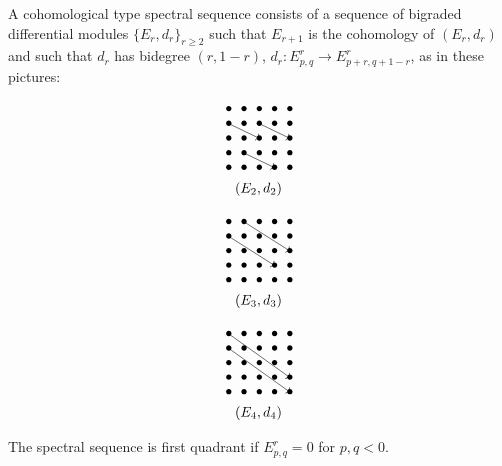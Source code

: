 \documentclass[../main.tex]{subfiles}
\begin{document}
\begin{defn}
\label{ss4:cohotype}

A cohomological type spectral sequence consists of a sequence of bigraded differential modules  $\{E_r,d_r\}_{r\geq 2}$ such that $E_{r+1}$ is the cohomology of $(E_r,d_r)$ and such that $d_r$ has bidegree $(r,1-r)$, $d_r\colon E^r_{p,q}\to E^r_{p+r,q+1-r}$, as in these pictures:

\begin{minipage}{0.3\textwidth}
\begin{align*}
&\xymatrix@=0pt{
 \bullet & \bullet & \bullet & \bullet & \bullet \\
 \bullet & \bullet & \bullet & \bullet & \bullet \\
 \bullet & \bullet & \ar@{<-}[]+C;[llu]+C\bullet & \bullet & \ar@{<-}[]+C;[llu]+C\bullet \\
 \bullet & \bullet & \bullet & \bullet & \bullet \\
 \bullet & \bullet & \bullet & \ar@{<-}[]+C;[llu]+C\bullet & \bullet \\
}\\
&\hspace{10pt}(E_2,d_2)
\end{align*}
\end{minipage}
\begin{minipage}{0.3\textwidth}
\begin{align*}
&\xymatrix@=0pt{
 \bullet & \bullet & \bullet & \bullet & \bullet \\
 \bullet & \bullet & \bullet & \bullet & \bullet \\
 \bullet & \bullet & \bullet & \bullet & \ar@{<-}[]+C;[llluu]+C\bullet \\
 \bullet & \bullet & \bullet & \ar@{<-}[]+C;[llluu]+C\bullet & \bullet \\
 \bullet & \bullet & \bullet & \bullet & \bullet \\
}\\
&\hspace{10pt}(E_3,d_3)
\end{align*}
\end{minipage}
\begin{minipage}{0.3\textwidth}
\begin{align*}
&\xymatrix@=0pt{
 \bullet & \bullet & \bullet & \bullet & \bullet \\
 \bullet & \bullet & \bullet & \bullet & \bullet \\
 \bullet & \bullet & \bullet & \bullet & \bullet \\
 \bullet & \bullet & \bullet & \bullet &  \ar@{<-}[]+C;[lllluuu]+C\bullet \\
 \bullet & \bullet & \bullet & \bullet & \ar@{<-}[]+C;[lllluuu]+C\bullet \\
}\\
&\hspace{10pt}(E_4,d_4)
\end{align*}
\end{minipage}
The spectral sequence is first quadrant if $E^r_{p,q} = 0$ for $p,q <0 $.
\end{defn}
\end{document}
